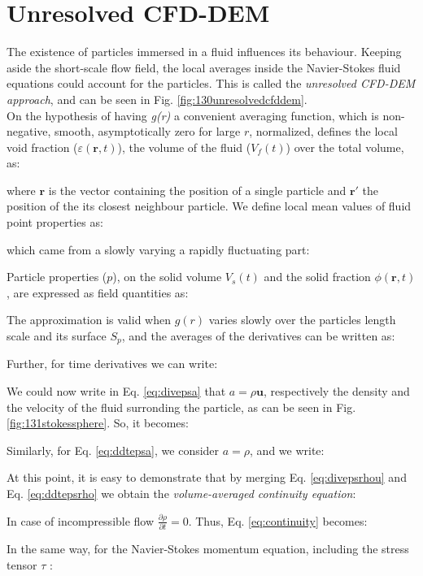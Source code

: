 \section{Unresolved CFD-DEM}
\label{sec:unresolvedcfddem}

The existence of particles immersed in a fluid influences its behaviour. 
Keeping aside the short-scale flow field, the local averages inside the
Navier-Stokes fluid equations could account for the particles.
This is called the \textit{unresolved \acs{CFD}-\acs{DEM} approach}, and can be
seen in Fig. \ref{fig:130unresolvedcfddem}.\\

On the hypothesis of having \textit{g(r)} a convenient averaging
function, which is non-negative, smooth, asymptotically zero for large $r$, normalized, \citet{RefWorks:201}
defines the local void fraction ($\varepsilon(\mathbf{r},t)$), the volume of the
fluid ($V_f(t)$) over the total volume, as:

where $\mathbf{r}$ is the vector containing the position of a single particle
and $\mathbf{r'}$ the position of the its closest neighbour particle.
We define local mean values of fluid point properties as:

which came from a slowly varying a rapidly fluctuating part:

Particle properties ($p$), on the solid volume $V_s(t)$ and the solid fraction
$\phi(\mathbf{r},t)$, are expressed as field quantities as:

The approximation is valid when $g(r)$ varies slowly over the particles length
scale and its surface $S_p$, and the averages of the derivatives can be written
as:

Further, for time derivatives we can write:


We could now write in Eq. \ref{eq:divepsa} that $a = \rho \mathbf{u}$,
respectively the density and the velocity of the fluid surronding the particle, as can be
seen in Fig. \ref{fig:131stokessphere}. So, it becomes:

Similarly, for Eq. \ref{eq:ddtepsa}, we consider $a = \rho$, and we write:

At this point, it is easy to demonstrate that by merging Eq. \ref{eq:divepsrhou}
and Eq. \ref{eq:ddtepsrho} we obtain the \textit{volume-averaged continuity
equation}:

In case of incompressible flow $\frac{\partial \rho}{\partial t} = 0$. Thus,
Eq.
\ref{eq:continuity} becomes:

In the same way, for the Navier-Stokes momentum equation, including the stress
tensor $\tau$ \cite{Refworks:202}:
